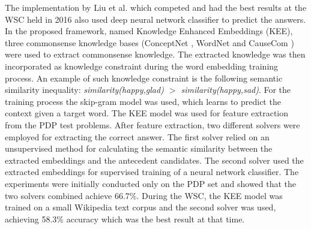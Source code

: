 The implementation by Liu et al. \cite{DBLP:journals/corr/LiuJLZWH16} which competed and had the best results at the WSC held in 2016 also used deep neural network classifier to predict the answers. In the proposed framework, named Knowledge Enhanced Embeddings (KEE), three commonsense knowledge bases (ConceptNet \cite{articleC}, WordNet \cite{DBLP:journals/cacm/Miller95} and CauseCom \cite{DBLP:journals/corr/Liu0LWH16}) were used to extract commonsense knowledge. The extracted knowledge was then incorporated as knowledge constraint during the word embedding training process. An example of such knowledge constraint is the following semantic similarity inequality: \textit{similarity(happy,glad) $>$ similarity(happy,sad)}. For the training process the skip-gram model \cite{DBLP:journals/corr/abs-1301-3781} was used, which learns to predict the context given a target word. The KEE model was used for feature extraction from the PDP test problems. After feature extraction, two different solvers were employed for extracting the correct answer. The first solver relied on an unsupervised method for calculating the semantic similarity between the extracted embeddings and the antecedent candidates. The second solver used the extracted embeddings for supervised training of a neural network classifier. The experiments were initially conducted only on the PDP set and showed that the two solvers combined achieve 66.7\%. During the WSC, the KEE model was trained on a small Wikipedia text corpus and the second solver was used, achieving 58.3\% accuracy which was the best result at that time. 


\begin{comment}
	In addition to the machine learning approaches, more recently published approaches use deep learning for training unsupervised language models. In contrast to the previous models, these models require large datasets for training.
\end{comment}


